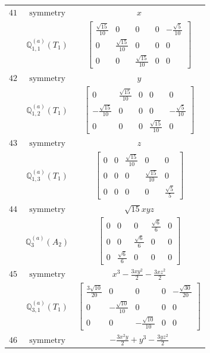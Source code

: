 \documentclass[fleqn,8pt,landscape]{jsarticle}
\begin{document}
\begin{longtable}{ccc}
$ 41 $ & $ \text{symmetry} $ & $ x $ \\
$  $ & $ \mathbb{Q}_{1,1}^{(a)}(T_{1}) $ & $ \begin{bmatrix} \frac{\sqrt{15}}{10} & 0 & 0 & 0 & - \frac{\sqrt{5}}{10} \\ 0 & \frac{\sqrt{15}}{10} & 0 & 0 & 0 \\ 0 & 0 & \frac{\sqrt{15}}{10} & 0 & 0 \end{bmatrix} $ \\ \hline
$ 42 $ & $ \text{symmetry} $ & $ y $ \\
$  $ & $ \mathbb{Q}_{1,2}^{(a)}(T_{1}) $ & $ \begin{bmatrix} 0 & \frac{\sqrt{15}}{10} & 0 & 0 & 0 \\ - \frac{\sqrt{15}}{10} & 0 & 0 & 0 & - \frac{\sqrt{5}}{10} \\ 0 & 0 & 0 & \frac{\sqrt{15}}{10} & 0 \end{bmatrix} $ \\ \hline
$ 43 $ & $ \text{symmetry} $ & $ z $ \\
$  $ & $ \mathbb{Q}_{1,3}^{(a)}(T_{1}) $ & $ \begin{bmatrix} 0 & 0 & \frac{\sqrt{15}}{10} & 0 & 0 \\ 0 & 0 & 0 & \frac{\sqrt{15}}{10} & 0 \\ 0 & 0 & 0 & 0 & \frac{\sqrt{5}}{5} \end{bmatrix} $ \\ \hline
$ 44 $ & $ \text{symmetry} $ & $ \sqrt{15} x y z $ \\
$  $ & $ \mathbb{Q}_{3}^{(a)}(A_{2}) $ & $ \begin{bmatrix} 0 & 0 & 0 & \frac{\sqrt{6}}{6} & 0 \\ 0 & 0 & \frac{\sqrt{6}}{6} & 0 & 0 \\ 0 & \frac{\sqrt{6}}{6} & 0 & 0 & 0 \end{bmatrix} $ \\ \hline
$ 45 $ & $ \text{symmetry} $ & $ x^{3} - \frac{3 x y^{2}}{2} - \frac{3 x z^{2}}{2} $ \\
$  $ & $ \mathbb{Q}_{3,1}^{(a)}(T_{1}) $ & $ \begin{bmatrix} \frac{3 \sqrt{10}}{20} & 0 & 0 & 0 & - \frac{\sqrt{30}}{20} \\ 0 & - \frac{\sqrt{10}}{10} & 0 & 0 & 0 \\ 0 & 0 & - \frac{\sqrt{10}}{10} & 0 & 0 \end{bmatrix} $ \\ \hline
$ 46 $ & $ \text{symmetry} $ & $ - \frac{3 x^{2} y}{2} + y^{3} - \frac{3 y z^{2}}{2} $ \\

\end{longtable}
\end{document}
